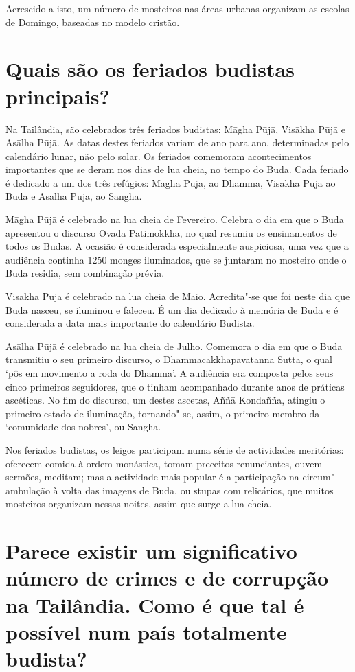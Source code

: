 Acrescido a isto, um número de mosteiros nas áreas urbanas organizam as
escolas de Domingo, baseadas no modelo cristão.

\section{Quais são os feriados budistas principais?}

\enlargethispage{\baselineskip}

Na Tailândia, são celebrados três feriados budistas: Māgha Pūjā, Visākha
Pūjā e Asālha Pūjā. As datas destes feriados variam de ano para ano,
determinadas pelo calendário lunar, não pelo solar. Os feriados
comemoram acontecimentos importantes que se deram nos dias de lua cheia,
no tempo do Buda. Cada feriado é dedicado a um dos três refúgios: Māgha
Pūjā, ao Dhamma, Visākha Pūjā ao Buda e Asālha Pūjā, ao Sangha.

Māgha Pūjā é celebrado na lua cheia de Fevereiro. Celebra o dia em que o
Buda apresentou o discurso Ovāda Pātimokkha, no qual resumiu os
ensinamentos de todos os Budas. A ocasião é considerada especialmente
auspiciosa, uma vez que a audiência continha 1250 monges iluminados, que
se juntaram no mosteiro onde o Buda residia, sem combinação prévia.

Visākha Pūjā é celebrado na lua cheia de Maio. Acredita"-se que foi neste
dia que Buda nasceu, se iluminou e faleceu. É um dia dedicado à memória
de Buda e é considerada a data mais importante do calendário Budista.

Asālha Pūjā é celebrado na lua cheia de Julho. Comemora o dia em que o
Buda transmitiu o seu primeiro discurso, o Dhammacakkhapavatanna Sutta,
o qual `pôs em movimento a roda do Dhamma'. A audiência era composta
pelos seus cinco primeiros seguidores, que o tinham acompanhado durante
anos de práticas ascéticas. No fim do discurso, um destes ascetas, Aññā
Kondañña, atingiu o primeiro estado de iluminação, tornando"-se, assim, o
primeiro membro da `comunidade dos nobres', ou Sangha.

Nos feriados budistas, os leigos participam numa série de actividades
meritórias: oferecem comida à ordem monástica, tomam preceitos
renunciantes, ouvem sermões, meditam; mas a actividade mais popular é a
participação na circum"-ambulação à volta das imagens de Buda, ou stupas
com relicários, que muitos mosteiros organizam nessas noites, assim que
surge a lua cheia.

\section{Parece existir um significativo número de crimes e de corrupção na
  Tailândia. Como é que tal é possível num país totalmente budista?}

